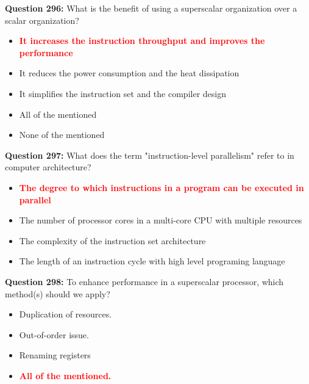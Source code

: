 \documentclass[12pt,a4paper]{article}
\begin{document}
\textbf{Question 296:} What is the benefit of using a superscalar organization over a scalar organization?

\begin{itemize}
    \item[\textbf{A.}] \textcolor{red}{\textbf{It increases the instruction throughput and improves the performance}}
    \item[\textbf{B.}] It reduces the power consumption and the heat dissipation
    \item[\textbf{C.}] It simplifies the instruction set and the compiler design
    \item[\textbf{D.}] All of the mentioned
    \item[\textbf{E.}] None of the mentioned
\end{itemize}

\vspace{0.5cm}

\textbf{Question 297:} What does the term "instruction-level parallelism" refer to in computer architecture?

\begin{itemize}
    \item[\textbf{A.}] \textcolor{red}{\textbf{The degree to which instructions in a program can be executed in parallel}}
    \item[\textbf{B.}] The number of processor cores in a multi-core CPU with multiple resources
    \item[\textbf{C.}] The complexity of the instruction set architecture
    \item[\textbf{D.}] The length of an instruction cycle with high level programing language
\end{itemize}

\vspace{0.5cm}

\textbf{Question 298:} To enhance performance in a superscalar processor, which method(s) should we apply?

\begin{itemize}
    \item[\textbf{A.}] Duplication of resources.
    \item[\textbf{B.}] Out-of-order issue.
    \item[\textbf{C.}] Renaming registers
    \item[\textbf{D.}] \textcolor{red}{\textbf{All of the mentioned.}}
\end{itemize}

\vspace{0.5cm}
\end{document}

